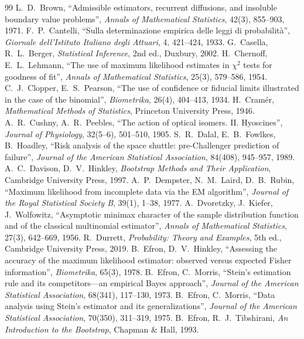 \documentclass[main.tex]{subfiles}
\begin{document}
\begin{thebibliography}{99}
 L.~D.~Brown, ``Admissible estimators, recurrent diffusions, and insoluble boundary value problems'', \emph{Annals of Mathematical Statistics}, 42(3), 855--903, 1971.
 F.~P.~Cantelli, ``Sulla determinazione empirica delle leggi di probabilità'', \emph{Giornale dell'Istituto Italiano degli Attuari}, 4, 421--424, 1933.
 G.~Casella, R.~L.~Berger, \emph{Statistical Inference}, 2nd ed., Duxbury, 2002.
 H.~Chernoff, E.~L.~Lehmann, ``The use of maximum likelihood estimates in $\chi^2$ tests for goodness of fit'', \emph{Annals of Mathematical Statistics}, 25(3), 579--586, 1954.
 C.~J.~Clopper, E.~S.~Pearson, ``The use of confidence or fiducial limits illustrated in the case of the binomial'', \emph{Biometrika}, 26(4), 404--413, 1934.
 H.~Cramér, \emph{Mathematical Methods of Statistics}, Princeton University Press, 1946.
 A.~R.~Cushny, A.~R.~Peebles, ``The action of optical isomers. II. Hyoscines'', \emph{Journal of Physiology}, 32(5--6), 501--510, 1905.
 S.~R.~Dalal, E.~B.~Fowlkes, B.~Hoadley, ``Risk analysis of the space shuttle: pre-Challenger prediction of failure'', \emph{Journal of the American Statistical Association}, 84(408), 945--957, 1989.
 A.~C.~Davison, D.~V.~Hinkley, \emph{Bootstrap Methods and Their Application}, Cambridge University Press, 1997.
 A.~P.~Dempster, N.~M.~Laird, D.~B.~Rubin, ``Maximum likelihood from incomplete data via the EM algorithm'', \emph{Journal of the Royal Statistical Society B}, 39(1), 1--38, 1977.
 A.~Dvoretzky, J.~Kiefer, J.~Wolfowitz, ``Asymptotic minimax character of the sample distribution function and of the classical multinomial estimator'', \emph{Annals of Mathematical Statistics}, 27(3), 642--669, 1956.
 R.~Durrett, \emph{Probability: Theory and Examples}, 5th ed., Cambridge University Press, 2019.
 B.~Efron, D.~V.~Hinkley, ``Assessing the accuracy of the maximum likelihood estimator: observed versus expected Fisher information'', \emph{Biometrika}, 65(3), 1978.
 B.~Efron, C.~Morris, ``Stein's estimation rule and its competitors---an empirical Bayes approach'', \emph{Journal of the American Statistical Association}, 68(341), 117--130, 1973.
 B.~Efron, C.~Morris, ``Data analysis using Stein's estimator and its generalizations'', \emph{Journal of the American Statistical Association}, 70(350), 311--319, 1975.
 B.~Efron, R.~J.~Tibshirani, \emph{An Introduction to the Bootstrap}, Chapman \& Hall, 1993.

\end{thebibliography}
\end{document}
